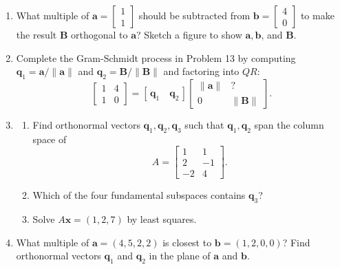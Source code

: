 \documentclass[14pt, a4paper]{article}
\begin{document}
\begin{enumerate}[resume]
    \item What multiple of $\boldsymbol{a} = \begin{bmatrix} 1 \\ 1 \end{bmatrix}$ should be subtracted from $\boldsymbol{b} = \begin{bmatrix} 4 \\ 0 \end{bmatrix}$ to make the result $\boldsymbol{B}$ orthogonal to $\boldsymbol{a}$? Sketch a figure to show $\boldsymbol{a}, \boldsymbol{b}$, and $\boldsymbol{B}$.

    \item Complete the Gram-Schmidt process in Problem 13 by computing $\boldsymbol{q}_1 = \boldsymbol{a} / \|\boldsymbol{a}\|$ and $\boldsymbol{q}_2 = \boldsymbol{B} / \|\boldsymbol{B}\|$ and factoring into $QR$:
          \[
              \begin{bmatrix} 1 & 4 \\ 1 & 0 \end{bmatrix} = [\, \boldsymbol{q}_1 \quad \boldsymbol{q}_2 \,] \begin{bmatrix} \|\boldsymbol{a}\| & ? \\ 0 & \|\boldsymbol{B}\| \end{bmatrix}.
          \]

    \item
          \begin{enumerate}
              \item Find orthonormal vectors $\boldsymbol{q}_1, \boldsymbol{q}_2, \boldsymbol{q}_3$ such that $\boldsymbol{q}_1, \boldsymbol{q}_2$ span the column space of
                    \[
                        A = \begin{bmatrix} 1 & 1 \\ 2 & -1 \\ -2 & 4 \end{bmatrix}.
                    \]
              \item Which of the four fundamental subspaces contains $\boldsymbol{q}_3$?
              \item Solve $A\boldsymbol{x} = (1, 2, 7)$ by least squares.
          \end{enumerate}

    \item What multiple of $\boldsymbol{a} = (4, 5, 2, 2)$ is closest to $\boldsymbol{b} = (1, 2, 0, 0)$? Find orthonormal vectors $\boldsymbol{q}_1$ and $\boldsymbol{q}_2$ in the plane of $\boldsymbol{a}$ and $\boldsymbol{b}$.


\end{enumerate}
\end{document}

